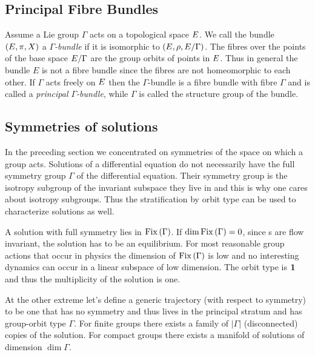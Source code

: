 \subsection{Principal Fibre Bundles}

Assume a Lie group $\Gamma$ acts on a topological space $E$. We call the bundle $(E,\pi,X)$ a \emph{$\Gamma$-bundle} if it is isomorphic to $(E,\rho,E/\Gamma)$. The fibres over the points of the base space $E/\Gamma$ are the group orbits of points in $E$.
Thus in general  the bundle $E$ is not a fibre bundle since the fibres are not homeomorphic to each other. If $\Gamma$ acts freely on
$E$ then the $\Gamma$-bundle is a fibre bundle with fibre $\Gamma$ and is called a \emph{principal $\Gamma$-bundle}, while $\Gamma$ is called the structure group of the bundle.

\subsection{Symmetries of solutions}

In the preceding section we concentrated on symmetries of the space on which a group acts.
Solutions of a differential equation do not necessarily have the full symmetry group $\Gamma$ of the differential
equation. Their symmetry group is the isotropy subgroup of the invariant subspace they live in and this is
why one cares about isotropy subgroups. Thus the stratification by orbit type can be used to characterize
solutions as well.

A solution with full symmetry lies in $\mathrm{Fix}\left(\Gamma\right)$. If $\dim\mathrm{Fix}\left(\Gamma\right)=0$, since \fixedsp s are flow
invariant, the solution has to be an equilibrium. For most reasonable group actions that occur in physics the dimension of $\mathrm{Fix}\left(\Gamma\right)$ is low and no interesting dynamics can occur in a linear subspace of low dimension.
The orbit type is $\mathbf{1}$ and thus the multiplicity of the solution is one.

At the other extreme let's define a generic trajectory (with respect to symmetry) to be one that has no
symmetry and thus lives in the principal stratum and has group-orbit type $\Gamma$. For finite groups there exists a family of $|\Gamma|$ (disconnected) copies of the solution. For compact groups there exists a manifold of solutions of dimension $\dim \Gamma$.


